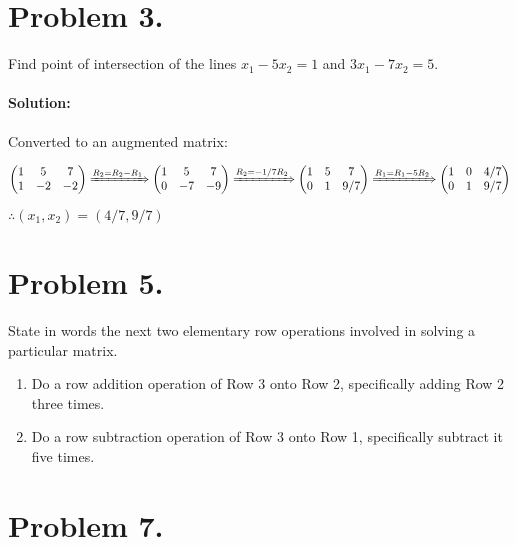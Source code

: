 \documentclass[11pt, notitlepage]{report}
\newenvironment{solution}{\paragraph{\small Solution:}}{\hfill}
\begin{document}
\newpage
\section{Problem 3.}

	Find point of intersection of the lines $x_1-5x_2=1$ and $3x_1-7x_2=5$.

\begin{solution}
		Converted to an augmented matrix:

		\[\left(
		\begin{matrix}{}
		  1& 5& 7 \\
		  1& -2& -2 \\
		\end{matrix} \right)
		\xRightarrow{R_2=R_2-R_1}
		\left(\begin{matrix}{}
		  1& 5& 7 \\
		  0& -7& -9 \\
		\end{matrix}
		\right)
		\xRightarrow{R_2=-1/7R_2}
		\left(\begin{matrix}{}
		  1& 5& 7 \\
		  0& 1& 9/7 \\
		\end{matrix}
		\right)
		\xRightarrow{R_1=R_1-5R_2}
		\left(\begin{matrix}{}
		  1& 0& 4/7 \\
		  0& 1& 9/7 \\
		\end{matrix}
		\right)
		\]

$\therefore (x_1,x_2)=(4/7,9/7)$

\end{solution}

\section{Problem 5.} State in words the next two elementary row operations involved in solving a particular matrix.

\begin{enumerate}
	\item Do a row addition operation of Row 3 onto Row 2, specifically adding Row 2 three times.
	\item Do a row subtraction operation of Row 3 onto Row 1, specifically subtract it  five times.
\end{enumerate}

\section{Problem 7.}
\end{document}

